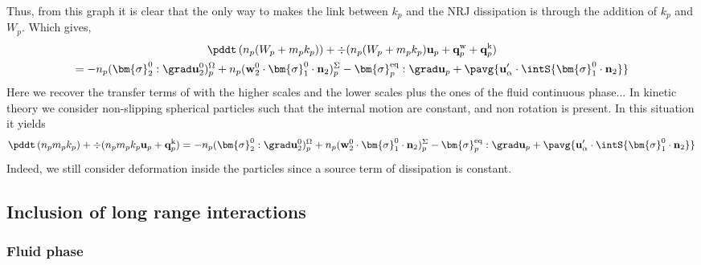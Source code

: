 Thus, from this graph it is clear that the only way to makes the link between $k_p$ and the NRJ dissipation is through the addition of $k_p$ and $W_p$. Which gives, 
\begin{multline*}
    \pddt \left(n_p (W_p+m_p k_p)\right)
    + \div 
    (n_p (W_p+m_p k_p)
    \textbf{u}_p 
    +  \textbf{q}_p^\text{w}
    +  \textbf{q}_p^\text{k}
    )\\
    = 
    - n_p (\bm{\sigma}_2^0 : \grad\textbf{u}_2^0)^\Omega_p
    + n_p (\textbf{w}_2^0 \cdot \bm{\sigma}_1^0 \cdot  \textbf{n}_2)^\Sigma_p
    - \bm{\sigma}_p^\text{eq}  :\grad \textbf{u}_p
    + \pavg{\textbf{u}_\alpha'\cdot\intS{\bm{\sigma}_1^0 \cdot \textbf{n}_2}}
\end{multline*}
Here we recover the transfer terms of with the higher scales and the lower scales plus the ones of the fluid continuous phase...
In kinetic theory we consider non-slipping spherical particles such that the internal motion are constant, and non rotation is present.
In this situation it yields 
\begin{equation}
    \pddt \left(n_p m_p k_p\right)
    + \div 
    (n_p m_p k_p
    \textbf{u}_p 
    +  \textbf{q}_p^\text{k}
    )
    = 
    - n_p (\bm{\sigma}_2^0 : \grad\textbf{u}_2^0)^\Omega_p
    + n_p (\textbf{w}_2^0 \cdot \bm{\sigma}_1^0 \cdot  \textbf{n}_2)^\Sigma_p
    - \bm{\sigma}_p^\text{eq}  :\grad \textbf{u}_p
    + \pavg{\textbf{u}_\alpha'\cdot\intS{\bm{\sigma}_1^0 \cdot \textbf{n}_2}}
\end{equation}
Indeed, we still consider deformation inside the particles since a source term of dissipation is constant. 



\subsection{Inclusion of long range interactions}
\subsubsection*{Fluid phase}

